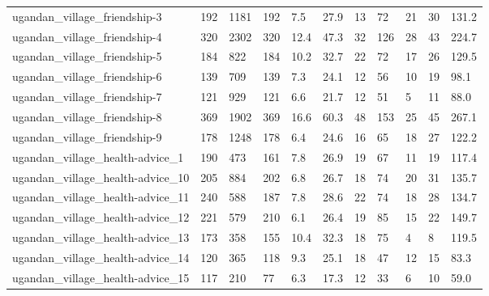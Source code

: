 \begin{longtable}{lllllllllll}
 ugandan\_village\_friendship-3                       & 192        & 1181      & 192   & 7.5    & 27.9   & 13    & 72     & 21     & 30     & 131.2   \\
 ugandan\_village\_friendship-4                       & 320        & 2302      & 320   & 12.4   & 47.3   & 32    & 126    & 28     & 43     & 224.7   \\
 ugandan\_village\_friendship-5                       & 184        & 822       & 184   & 10.2   & 32.7   & 22    & 72     & 17     & 26     & 129.5   \\
 ugandan\_village\_friendship-6                       & 139        & 709       & 139   & 7.3    & 24.1   & 12    & 56     & 10     & 19     & 98.1    \\
 ugandan\_village\_friendship-7                       & 121        & 929       & 121   & 6.6    & 21.7   & 12    & 51     & 5      & 11     & 88.0    \\
 ugandan\_village\_friendship-8                       & 369        & 1902      & 369   & 16.6   & 60.3   & 48    & 153    & 25     & 45     & 267.1   \\
 ugandan\_village\_friendship-9                       & 178        & 1248      & 178   & 6.4    & 24.6   & 16    & 65     & 18     & 27     & 122.2   \\
 ugandan\_village\_health-advice\_1                    & 190        & 473       & 161   & 7.8    & 26.9   & 19    & 67     & 11     & 19     & 117.4   \\
 ugandan\_village\_health-advice\_10                   & 205        & 884       & 202   & 6.8    & 26.7   & 18    & 74     & 20     & 31     & 135.7   \\
 ugandan\_village\_health-advice\_11                   & 240        & 588       & 187   & 7.8    & 28.6   & 22    & 74     & 18     & 28     & 134.7   \\
 ugandan\_village\_health-advice\_12                   & 221        & 579       & 210   & 6.1    & 26.4   & 19    & 85     & 15     & 22     & 149.7   \\
 ugandan\_village\_health-advice\_13                   & 173        & 358       & 155   & 10.4   & 32.3   & 18    & 75     & 4      & 8      & 119.5   \\
 ugandan\_village\_health-advice\_14                   & 120        & 365       & 118   & 9.3    & 25.1   & 18    & 47     & 12     & 15     & 83.3    \\
 ugandan\_village\_health-advice\_15                   & 117        & 210       & 77    & 6.3    & 17.3   & 12    & 33     & 6      & 10     & 59.0    \\

\end{longtable}

